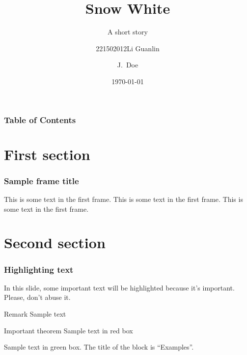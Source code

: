 \documentclass{beamer}
\title[About Snow White]
{Snow White}
\subtitle{A short story}
\author[Eric, Doe] %
{221502012Li Guanlin\inst{1} \and J.~Doe\inst{1}}
\institute[NJU] %
{
\inst{1}%
Undeegraduate in ICS\\
Nanjing University
}
\date[NJU 2023] %
{\today}
\begin{document}
\frame{\titlepage}

\begin{frame}
    \frametitle{Table of Contents}
    \tableofcontents
\end{frame}

\section{First section}

\begin{frame}
    \frametitle{Sample frame title}
    This is some text in the first frame. This is some text in the first frame. This is some text in the first frame.
\end{frame}

\section{Second section}

\begin{frame}
    \frametitle{Highlighting text}

    In this slide, some important text will be
    \alert{highlighted} because it's important.
    Please, don't abuse it.

    \begin{block}{Remark}
        Sample text
    \end{block}

    \begin{alertblock}{Important theorem}
        Sample text in red box
    \end{alertblock}

    \begin{examples}
        Sample text in green box. The title of the block is ``Examples''.
    \end{examples}
\end{frame}
\end{document}
